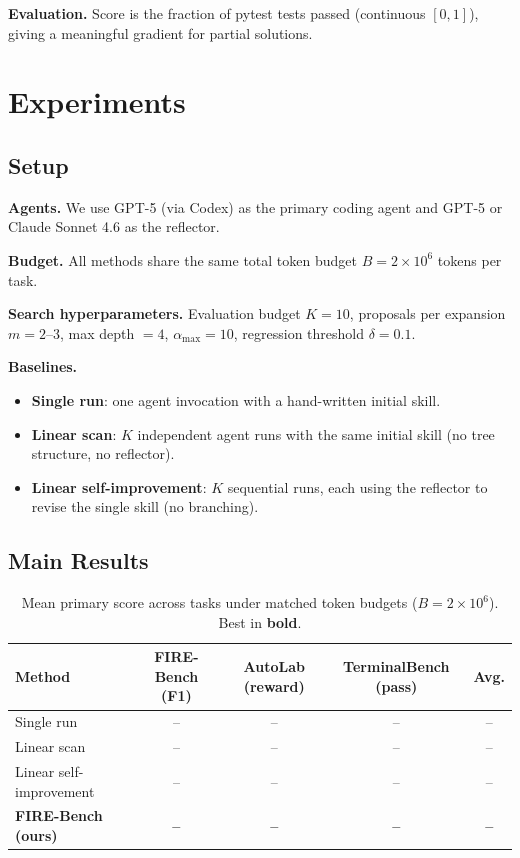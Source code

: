 \documentclass{article}
\begin{document}
\textbf{Evaluation.}
Score is the fraction of pytest tests passed (continuous $[0,1]$), giving a meaningful gradient for partial solutions.

\section{Experiments}
\label{sec:experiments}

\subsection{Setup}

\textbf{Agents.} We use GPT-5 (via Codex) as the primary coding agent and GPT-5 or Claude Sonnet 4.6 as the reflector.

\textbf{Budget.} All methods share the same total token budget $B = 2 \times 10^6$ tokens per task.

\textbf{Search hyperparameters.} Evaluation budget $K=10$, proposals per expansion $m=2$--$3$, max depth $=4$, $\alpha_{\max}=10$, regression threshold $\delta=0.1$.

\textbf{Baselines.}
\begin{itemize}
    \item \textbf{Single run}: one agent invocation with a hand-written initial skill.
    \item \textbf{Linear scan}: $K$ independent agent runs with the same initial skill (no tree structure, no reflector).
    \item \textbf{Linear self-improvement}: $K$ sequential runs, each using the reflector to revise the single skill (no branching).
\end{itemize}

\subsection{Main Results}

\begin{table}[t]
\centering
\caption{Mean primary score across tasks under matched token budgets ($B = 2 \times 10^6$). Best in \textbf{bold}.}
\label{tab:main}
\begin{tabular}{lcccc}
\toprule
\textbf{Method} & \textbf{FIRE-Bench (F1)} & \textbf{AutoLab (reward)} & \textbf{TerminalBench (pass)} & \textbf{Avg.} \\
\midrule
Single run              & --   & --   & --   & -- \\
Linear scan             & --   & --   & --   & -- \\
Linear self-improvement & --   & --   & --   & -- \\
\textbf{FIRE-Bench (ours)} & \textbf{--} & \textbf{--} & \textbf{--} & \textbf{--} \\
\bottomrule
\end{tabular}
\end{table}
\end{document}
